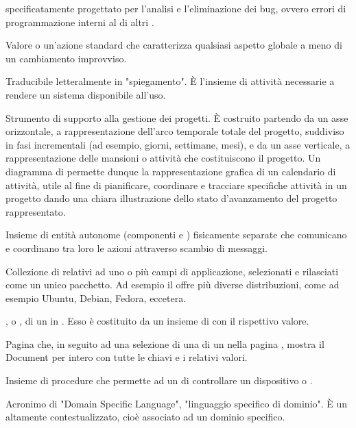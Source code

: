 { specificatamente progettato per l'analisi e l'eliminazione dei bug, ovvero errori di programmazione interni al  di altri .}

{Valore o un'azione standard che caratterizza qualsiasi aspetto globale a meno di un cambiamento improvviso.}

{Traducibile letteralmente in "spiegamento". \`{E} l'insieme di attività necessarie a rendere un sistema  disponibile all'uso.}

{Strumento di supporto alla gestione dei progetti. \`{E} costruito partendo da un asse orizzontale, a rappresentazione dell'arco temporale totale del progetto, suddiviso in fasi incrementali (ad esempio, giorni, settimane, mesi), e da un asse verticale, a rappresentazione delle mansioni o attività che costituiscono il progetto. Un diagramma di  permette dunque la rappresentazione grafica di un calendario di attività, utile al fine di pianificare, coordinare e tracciare specifiche attività in un progetto dando una chiara illustrazione dello stato d'avanzamento del progetto rappresentato.} 

{Insieme di entità autonome (componenti  e ) fisicamente separate che comunicano e coordinano tra loro le azioni attraverso scambio di messaggi.}

{Collezione di  relativi ad uno o più campi di applicazione, selezionati e rilasciati come un unico pacchetto. Ad esempio il   offre più diverse distribuzioni, come ad esempio Ubuntu, Debian, Fedora, eccetera.}

{, o , di un  in . Esso è costituito da un insieme di  con il rispettivo valore.}

{Pagina che, in seguito ad una selezione di una  di un  nella pagina , mostra il Document per intero con tutte le chiavi e i relativi valori.}

{Insieme di procedure che permette ad un  di controllare un dispositivo  o .}

{Acronimo di "Domain Specific Language", "linguaggio specifico di dominio". \`{E} un  altamente contestualizzato, cioè associato ad un dominio specifico.} 


